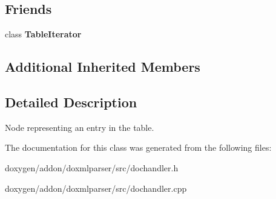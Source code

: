 \subsection*{Friends}
\begin{DoxyCompactItemize}
\item 
\mbox{\label{class_table_handler_ab0165532e287d023758cc64c24e40fb7}} 
class {\bfseries Table\+Iterator}
\end{DoxyCompactItemize}
\subsection*{Additional Inherited Members}


\subsection{Detailed Description}
Node representing an entry in the table. 



The documentation for this class was generated from the following files\+:\begin{DoxyCompactItemize}
\item 
doxygen/addon/doxmlparser/src/dochandler.\+h\item 
doxygen/addon/doxmlparser/src/dochandler.\+cpp\end{DoxyCompactItemize}
